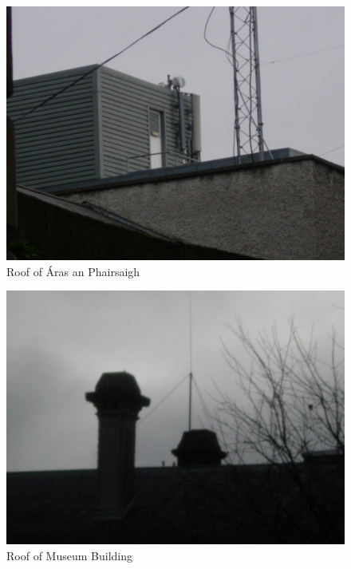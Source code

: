 \documentclass[a4paper,12pt]{article}
\begin{document}
\begin{figure}[h]

\includegraphics{7.png}

\caption{Roof of \'{A}ras an Phairsaigh}

\end{figure}

\begin{figure}[h]

\includegraphics{8.png}

\caption{Roof of Museum Building}

\end{figure}
\end{document}
